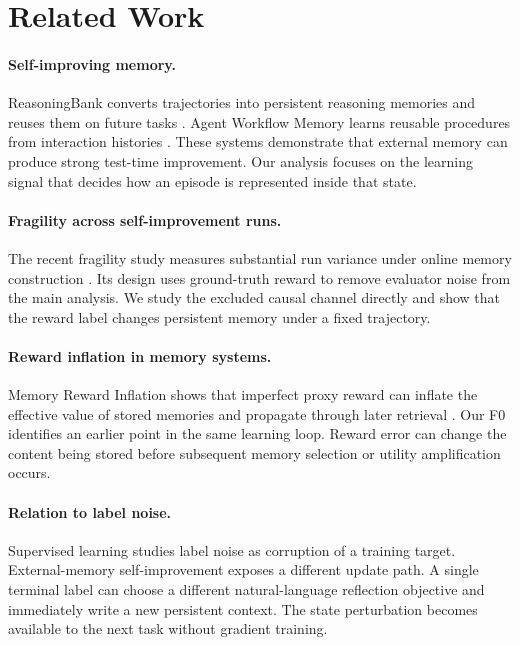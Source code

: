 \section{Related Work}
\paragraph{Self-improving memory.} ReasoningBank converts trajectories into persistent reasoning memories and reuses them on future tasks \citep{ouyang2026reasoningbank}. Agent Workflow Memory learns reusable procedures from interaction histories \citep{wang2024awm}. These systems demonstrate that external memory can produce strong test-time improvement. Our analysis focuses on the learning signal that decides how an episode is represented inside that state.

\paragraph{Fragility across self-improvement runs.} The recent fragility study measures substantial run variance under online memory construction \citep{ye2026fragility}. Its design uses ground-truth reward to remove evaluator noise from the main analysis. We study the excluded causal channel directly and show that the reward label changes persistent memory under a fixed trajectory.

\paragraph{Reward inflation in memory systems.} Memory Reward Inflation shows that imperfect proxy reward can inflate the effective value of stored memories and propagate through later retrieval \citep{asadolahi2026inflation}. Our F0 identifies an earlier point in the same learning loop. Reward error can change the content being stored before subsequent memory selection or utility amplification occurs.

\paragraph{Relation to label noise.} Supervised learning studies label noise as corruption of a training target. External-memory self-improvement exposes a different update path. A single terminal label can choose a different natural-language reflection objective and immediately write a new persistent context. The state perturbation becomes available to the next task without gradient training.
